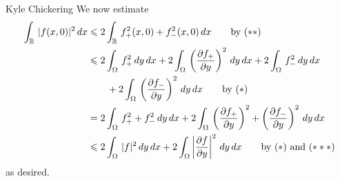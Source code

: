 \begin{solution}{Kyle Chickering}
	We now estimate
	\begin{align*}
		\int_{\mathbb{R}}\,|f(x,0)|^2\,dx
		&\leqslant 2\int_{\mathbb{R}}\,f_+^2(x,0)+f_-^2(x,0)\,dx \qquad \text{by
			($**$)} \\
		&\leqslant 2\int_{\Omega}\,f_+^2\,dy\,dx +
			2\int_{\Omega}\,\left(\frac{\partial f_+}{\partial
			y}\right)^2\,dy\,dx + 2\int_{\Omega}\,f_-^2\,dy\,dx \\ &\qquad+
			2\int_{\Omega}\,\left(\frac{\partial f_-}{\partial
			y}\right)^2\,dy\,dx \qquad \text{by ($*$)} \\
		&=2\int_{\Omega}\,f_+^2 + f_-^2\,dy\,dx + 2\int_{\Omega}\,\left(\frac{\partial f_+}{\partial
			y}\right)^2 + \left(\frac{\partial f_-}{\partial
			y}\right)^2\,dy\,dx \\
		&\leqslant 2\int_{\Omega}\,|f|^2\,dy\,dx +
			2\int_{\Omega}\left|\frac{\partial f}{\partial
			y}\right|^2\,dy\,dx \qquad \text{by ($*$) and ($***$)}
	\end{align*}
	as desired.
\end{solution}

